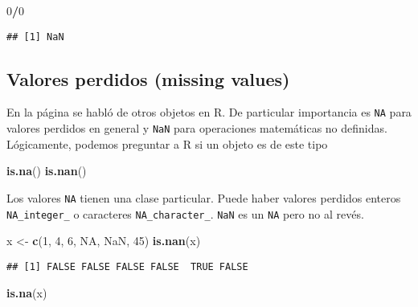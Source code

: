 \documentclass[]{article}
\newenvironment{Shaded}{\begin{snugshade}}{\end{snugshade}}
\newcommand{\KeywordTok}[1]{\textcolor[rgb]{0.13,0.29,0.53}{\textbf{#1}}}
\newcommand{\DecValTok}[1]{\textcolor[rgb]{0.00,0.00,0.81}{#1}}
\newcommand{\StringTok}[1]{\textcolor[rgb]{0.31,0.60,0.02}{#1}}
\newcommand{\OtherTok}[1]{\textcolor[rgb]{0.56,0.35,0.01}{#1}}
\newcommand{\OperatorTok}[1]{\textcolor[rgb]{0.81,0.36,0.00}{\textbf{#1}}}
\newcommand{\NormalTok}[1]{#1}
\begin{document}
\begin{Shaded}
\begin{Highlighting}[]
\DecValTok{0}\OperatorTok{/}\DecValTok{0}
\end{Highlighting}
\end{Shaded}

\begin{verbatim}
## [1] NaN
\end{verbatim}

\subsection{Valores perdidos (missing
values)}\label{valores-perdidos-missing-values}

En la página \pageref{otros-objetos-importantes} se habló de otros
objetos en R. De particular importancia es \texttt{NA} para valores
perdidos en general y \texttt{NaN} para operaciones matemáticas no
definidas. Lógicamente, podemos preguntar a R si un objeto es de este
tipo

\begin{Shaded}
\begin{Highlighting}[]
\KeywordTok{is.na}\NormalTok{()}
\KeywordTok{is.nan}\NormalTok{()}
\end{Highlighting}
\end{Shaded}

Los valores \texttt{NA} tienen una clase particular. Puede haber valores
perdidos enteros \texttt{NA\_integer\_} o caracteres
\texttt{NA\_character\_}. \texttt{NaN} es un \texttt{NA} pero no al
revés.

\begin{Shaded}
\begin{Highlighting}[]
\NormalTok{x <-}\StringTok{ }\KeywordTok{c}\NormalTok{(}\DecValTok{1}\NormalTok{, }\DecValTok{4}\NormalTok{, }\DecValTok{6}\NormalTok{, }\OtherTok{NA}\NormalTok{, }\OtherTok{NaN}\NormalTok{, }\DecValTok{45}\NormalTok{)}
\KeywordTok{is.nan}\NormalTok{(x)}
\end{Highlighting}
\end{Shaded}

\begin{verbatim}
## [1] FALSE FALSE FALSE FALSE  TRUE FALSE
\end{verbatim}

\begin{Shaded}
\begin{Highlighting}[]
\KeywordTok{is.na}\NormalTok{(x)}
\end{Highlighting}
\end{Shaded}
\end{document}
